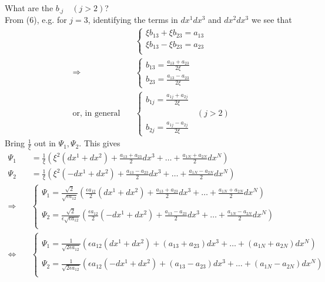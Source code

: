 What are the $b_{.j}\quad (j>2)$? \\From (6), e.g. for $j=3$,  identifying the terms in $dx^1dx^3$ and $dx^2dx^3$ we see that
\begin{align}
&\left \{ \begin{array}{l} 
 \xi b_{13}+\xi b_{23} =a_{13}\\ 
\xi b_{13}-\xi b_{23} =a_{23}\\ 
\end{array}\right.\\
\Rightarrow \quad &\left \{ \begin{array}{l} 
 b_{13}=\frac{a_{13}+a_{23}}{2\xi}\\ 
 b_{23}=\frac{a_{13}-a_{23}}{2\xi}
\end{array}\right.\\
\text{or, in general} \quad &\left \{ \begin{array}{ll} 
 b_{1j}=\frac{a_{1j}+a_{2j}}{2\xi}\\
 \ &\ (j>2)\\ 
 b_{2j}=\frac{a_{1j}-a_{2j}}{2\xi}
\end{array}\right.
\end{align}
Bring $\frac{1}{\xi}$ out in $\Psi_1, \Psi_2$. This gives
\begin{align}
\Psi_1 &= \frac{1}{\xi}\left( \xi^2( dx^1+ dx^2) + \frac{a_{13}+a_{23}}{2}dx^3+ \dots +\frac{a_{1N}+a_{2N}}{2}dx^N \right) \\
\Psi_2 &= \frac{1}{\xi}\left( \xi^2(- dx^1+ dx^2) + \frac{a_{13}-a_{23}}{2}dx^3+ \dots +\frac{a_{1N}-a_{2N}}{2}dx^N \right) \\
\Rightarrow \quad &\left \{ \begin{array}{l} 
\Psi_1 = \frac{\sqrt{2}}{\sqrt{\epsilon a_{12}}}\left( \frac{\epsilon a_{12}}{2 } (dx^1+ dx^2) + \frac{a_{13}+a_{23}}{2}dx^3+ \dots +\frac{a_{1N}+a_{2N}}{2}dx^N \right) \\\\
\Psi_2 = \frac{\sqrt{2}}{\epsilon\sqrt{\epsilon a_{12}}}\left( \frac{\epsilon a_{12}}{2 } (-dx^1+ dx^2) + \frac{a_{13}-a_{23}}{2}dx^3+ \dots +\frac{a_{1N}-a_{2N}}{2}dx^N \right) \\
\end{array}\right.\\
\Leftrightarrow \quad &\left \{ \begin{array}{l} \\
\Psi_1 = \frac{1}{\sqrt{2 \epsilon a_{12}}}\left(\epsilon a_{12}(dx^1+ dx^2) + (a_{13}+a_{23})dx^3+ \dots +(a_{1N}+a_{2N})dx^N \right) \\\\
\Psi_2 = \frac{1}{\sqrt{2 \epsilon a_{12}}}\left( \epsilon a_{12}(- dx^1+ dx^2) + (a_{13}-a_{23})dx^3+ \dots +(a_{1N}-a_{2N})dx^N \right) \\
\end{array}\right.
\end{align}
